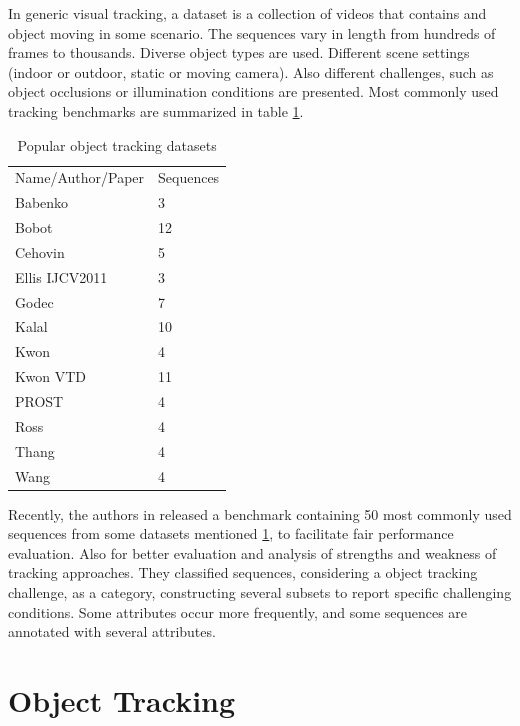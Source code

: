 In generic visual tracking, a dataset is a collection of videos that contains and object moving in some scenario. The sequences vary in length from hundreds of frames to thousands. Diverse object types are used. Different scene settings (indoor or outdoor, static or moving camera). Also different challenges, such as object occlusions or illumination conditions are presented. Most commonly used tracking benchmarks are summarized in table \ref{table:datasets}.

\begin{table}[h!]
\centering
\begin{tabular}{|ll|}
\hline
Name/Author/Paper & Sequences \\
Babenko           & 3         \\
Bobot             & 12        \\
Cehovin           & 5         \\
Ellis IJCV2011    & 3         \\
Godec             & 7         \\
Kalal             & 10        \\
Kwon              & 4         \\
Kwon VTD          & 11        \\
PROST             & 4         \\
Ross              & 4         \\
Thang             & 4         \\
Wang              & 4         \\
\hline
\end{tabular}
\caption{Popular object tracking datasets}
\label{table:datasets}
\end{table}


Recently, the authors in \cite{Wu2013b} released a benchmark containing 50 most commonly used sequences from some datasets mentioned \ref{table:datasets}, to facilitate fair performance evaluation. Also for better evaluation and analysis of strengths and weakness of tracking approaches. They classified sequences, considering a object tracking challenge, as a category, constructing several subsets to report specific challenging conditions. Some attributes occur more frequently, and some sequences are annotated with several attributes.


\section{Object Tracking}

